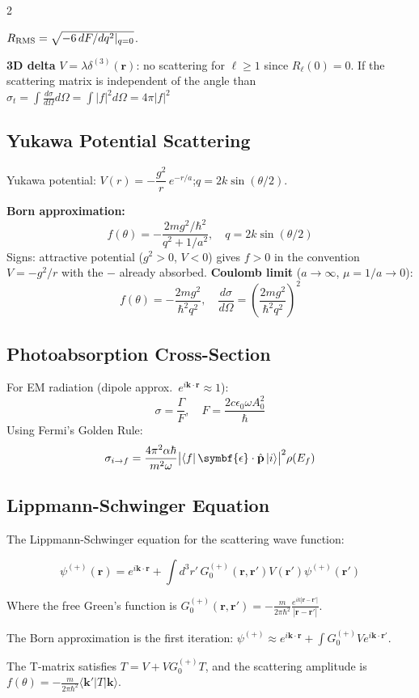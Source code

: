 \documentclass[9pt,a4paper]{article} %
\newcommand{\bs}[1]{\symbf{#1}}\usepackage{empheq}   %
\begin{document}
\begin{multicols}{2}
{$R_{\rm RMS}=\sqrt{-6\,dF/dq^2|_{q=0}}$.

\textbf{3D delta} $V=\lambda\delta^{(3)}(\mathbf{r})$: no scattering for $\ell\ge 1$ since $R_\ell(0)=0$.
If the scattering matrix is independent of the angle than $\sigma_t = \int \frac{d\sigma}{d\Omega} d\Omega = \int |f|^2 d\Omega = 4\pi |f|^2$
}

\subsection{Yukawa Potential Scattering}
Yukawa potential: $V(r)=-\dfrac{g^2}{r}\,e^{-r/a}$;\quad $q=2k\sin(\theta/2)$.

\textbf{Born approximation:}
\[
f(\theta)=-\frac{2mg^2/\hbar^2}{q^2+1/a^2},\quad q=2k\sin(\theta/2)
\]
{\footnotesize Signs: attractive potential ($g^2>0$, $V<0$) gives $f>0$ in the convention $V=-g^2/r$ with the $-$ already absorbed.}
\textbf{Coulomb limit} ($a\to\infty$, $\mu=1/a\to0$):
\[
f(\theta)=-\frac{2mg^2}{\hbar^2 q^2},\quad \frac{d\sigma}{d\Omega}=\left(\frac{2mg^2}{\hbar^2 q^2}\right)^2
\]
\subsection{Photoabsorption Cross-Section}
For EM radiation (dipole approx.~$e^{i\mathbf{k}\cdot\mathbf{r}}\approx 1$):
\[
\sigma=\frac{\Gamma}{F},\quad F=\frac{2c\epsilon_0\omega A_0^2}{\hbar}
\]
Using Fermi's Golden Rule:
\[
\sigma_{i\to f}=\frac{4\pi^2\alpha\hbar}{m^2\omega}\bigl|\bra{f}\bs{\epsilon}\cdot\hat{\mathbf{p}}\ket{i}\bigr|^2\rho(E_f)
\]

\subsection{Lippmann-Schwinger Equation}

The Lippmann-Schwinger equation for the scattering wave function:

\[
\boxed{\psi^{(+)}(\mathbf{r}) = e^{i\mathbf{k}\cdot\mathbf{r}} + \int d^3 r' \, G_0^{(+)}(\mathbf{r},\mathbf{r}') V(\mathbf{r}') \psi^{(+)}(\mathbf{r}')}
\]

Where the free Green's function is $G_0^{(+)}(\mathbf{r},\mathbf{r}') = -\frac{m}{2\pi\hbar^2} \frac{e^{ik|\mathbf{r}-\mathbf{r}'|}}{|\mathbf{r}-\mathbf{r}'|}$.

The Born approximation is the first iteration: $\psi^{(+)} \approx e^{i\mathbf{k}\cdot\mathbf{r}} + \int G_0^{(+)} V e^{i\mathbf{k}\cdot\mathbf{r}'}$.

The T-matrix satisfies $T = V + V G_0^{(+)} T$, and the scattering amplitude is $f(\theta) = -\frac{m}{2\pi\hbar^2} \langle \mathbf{k}' | T | \mathbf{k} \rangle$.


\end{multicols}
\end{document}
